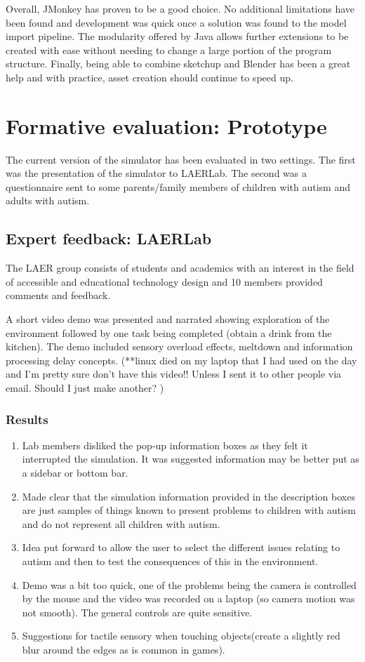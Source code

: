 \documentclass[11pt]{report}
\begin{document}
Overall, JMonkey has proven to be a good choice. No additional limitations have been found and development was quick once a solution was found to the model import pipeline. The modularity offered by Java allows
further extensions to be created with ease without needing to change a large portion of the program structure. Finally, being able to combine sketchup and Blender has been a great help and with practice, asset creation should
continue to speed up.

\chapter{Formative evaluation: Prototype}
The current version of the simulator has been evaluated in two settings. The first was the presentation of the simulator to LAERLab. The second was a questionnaire sent to some parents/family members of children with autism and adults with autism.

\section{Expert feedback: LAERLab}
The LAER group consists of students and academics with an interest in the field of accessible and educational technology design and 10 members provided comments and feedback.

A short video demo was presented and narrated showing exploration of the environment followed by one task being completed (obtain a drink from the kitchen). The demo included sensory overload effects, meltdown and information processing delay concepts. (**linux died on my laptop that I had used on the day and I'm pretty sure don't have this video!! Unless I sent it to other people via email. Should I just make another? )

\subsection{Results}

\begin{enumerate}
\item Lab members disliked the pop-up information boxes as they felt it interrupted the simulation. It was suggested information may be better put as a sidebar or bottom bar.
\item Made clear that the simulation information provided in the description boxes are just samples of things known to present problems to children with autism and do not represent all children with autism.
\item Idea put forward to allow the user to select the different issues relating to autism and then to test the consequences of this in the environment. 
\item Demo was a bit too quick, one of the problems being the camera is controlled by the mouse and the video was recorded on a laptop (so camera motion was not smooth). The general controls are quite sensitive.
\item Suggestions for tactile sensory when touching objects(create a slightly red blur around the edges as is common in games).
\end{enumerate}
\end{document}
